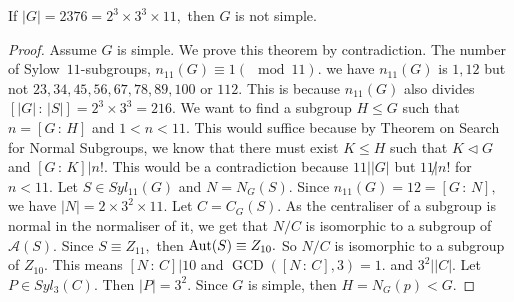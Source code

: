 \begin{example}
	If $ \lvert G \rvert = 2376 = 2^3 \times 3^3 \times 11,$ then $G$ is not simple.
\end{example}
\begin{proof}
	Assume $G$ is simple. We prove this theorem by contradiction.
	The number of Sylow~$11$\nobreakdash-subgroups, $n_{11}(G) \equiv 1 (\mod 11).$
	we have $n_{11}(G)$ is $1, 12 $ but not $23, 34, 45, 56, 67, 78, 89, 100$ or $ 112.$
	This is because $n_{11}(G) $ also divides $ \left[ \lvert G \rvert \, :
	\, \lvert S \rvert\right] = 2^3 \times 3^3 = 216.$
	We want to find a subgroup $H \leq G$ such that $n = \left[ G \, : \, H \right] $
	and $1 < n < 11.$ This would suffice because by Theorem on Search for Normal Subgroups, we know that there
	must exist $ K \leq H $  such that $K \triangleleft G$ and 
	$\left[ G \, : \, K \right] | n!.$ This would be a contradiction because 
	$11 | \lvert G \rvert$ but $ 11 \not | n!$ for $n < 11.$
	Let $S \in Syl_{11}(G) $ and $N = N_G(S).$ Since $n_{11}(G) = 12 = 
	\left[ G \, : \, N \right] ,$ we have $ \lvert N \rvert = 2 \times 3^2 \times 11.$
	Let $C = C_G(S).$ As the centraliser of a subgroup is normal in the normaliser of
	it, we get that $N / C $ is isomorphic to a subgroup of $\mathcal{A}(S).$
	Since $S \equiv Z _{11},$ then $\operatorname{Aut}(S) \equiv Z _{10}.$ So $N/C$ is 
	isomorphic to a subgroup of $Z _{10} .$ This means $ \left[ N \, : \, C \right] 
	| 10 $ and $\operatorname{GCD}( \left[ N \, : \, C \right] , 3) = 1. $
	and $3^2 | \lvert C \rvert.$
	Let $P \in Syl_3(C).$ Then $ \lvert P \rvert = 3^2.$ Since $G$ is simple, then
	$H = N_G(p) < G.$
\end{proof}
